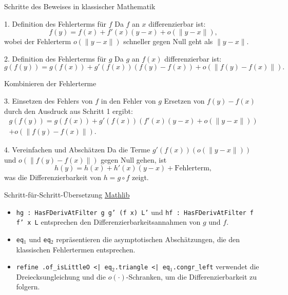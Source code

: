 \documentclass{beamer}
\begin{document}
\begin{frame}{Schritte des Beweises in klassischer Mathematik}
    \begin{block}{1. Definition des Fehlerterms für \( f \)}
        Da \( f \) an \( x \) differenzierbar ist:
        \[
        f(y) = f(x) + f'(x)(y - x) + o(\| y - x \|),
        \]
        wobei der Fehlerterm \( o(\| y - x \|) \) schneller gegen Null geht als \( \| y - x \| \).
    \end{block}

    \begin{block}{2. Definition des Fehlerterms für \( g \)}
        Da \( g \) an \( f(x) \) differenzierbar ist:
        \[
        g(f(y)) = g(f(x)) + g'(f(x))(f(y) - f(x)) + o(\| f(y) - f(x) \|).
        \]
    \end{block}
\end{frame}

\begin{frame}{Kombinieren der Fehlerterme}
    \begin{block}{3. Einsetzen des Fehlers von \( f \) in den Fehler von \( g \)}
        Ersetzen von \( f(y) - f(x) \) durch den Ausdruck aus Schritt 1 ergibt:
        \begin{align*}
        g(f(y)) = g(f(x)) + g'(f(x))\left(f'(x)(y - x)  + o(\| y - x \|)\right)  \\ 
        + o(\| f(y) - f(x) \|).
    \end{align*}
\end{block}

    \begin{block}{4. Vereinfachen und Abschätzen}
        Da die Terme \( g'(f(x))(o(\| y - x \|)) \) und \( o(\| f(y) - f(x) \|) \) gegen Null gehen, ist
        \[
        h(y) = h(x) + h'(x)(y - x) + \text{Fehlerterm},
        \]
        was die Differenzierbarkeit von \( h = g \circ f \) zeigt.
    \end{block}
\end{frame}



\begin{frame}
    \begin{block}{Schritt-für-Schritt-Übersetzung \href{https://github.com/leanprover-community/mathlib4/blob/f4f0b47a2f859d27e965c812344deb1435fe8d48/Mathlib/Analysis/Calculus/FDeriv/Comp.lean\#L51-L57}{Mathlib}}
        \begin{itemize}
            \item \texttt{hg : HasFDerivAtFilter g g' (f x) L'} und \texttt{hf : HasFDerivAtFilter f f' x L} entsprechen den Differenzierbarkeitsannahmen von \( g \) und \( f \).
            \item \texttt{eq\(_1\)} und \texttt{eq\(_2\)} repräsentieren die asymptotischen Abschätzungen, die den klassischen Fehlertermen entsprechen.
            \item \texttt{refine .of\_isLittleO <| eq\(_2\).triangle <| eq\(_1\).congr\_left} verwendet die Dreiecksungleichung und die \( o(\cdot) \)-Schranken, um die Differenzierbarkeit zu folgern.
        \end{itemize}
    \end{block}
\end{frame}
\end{document}
